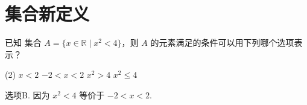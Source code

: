 \section{集合新定义}

\begin{exe}
    已知 集合 $A = \{x \in \mathbb{R} \mid x^2 < 4\}$，则 $A$ 的元素满足的条件可以用下列哪个选项表示？   
\end{exe}
\begin{tasks}(2)
    \task $x < 2$
    \task $-2 < x < 2$
    \task $x^2 > 4$
    \task $x^2 \le 4$
\end{tasks}
\begin{sol}
    选项B. 因为 $x^2 < 4$ 等价于 $-2 < x < 2$. 
\end{sol}   